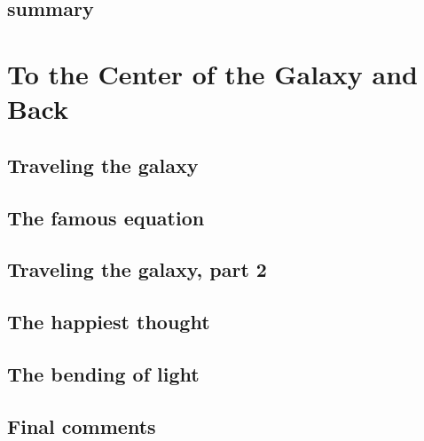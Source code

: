 \documentclass[pagesize,headsepline,10pt,parskip=half]{scrreprt}
\begin{document}
    \section{summary}

  \chapter{To the Center of the Galaxy and Back}
    \section{Traveling the galaxy}
    \section{The famous equation}
    \section{Traveling the galaxy, part 2}
    \section{The happiest thought}
    \section{The bending of light}
    \section{Final comments}

  \begingroup
    \printbibliography[heading=lit]
  \endgroup
\end{document}
